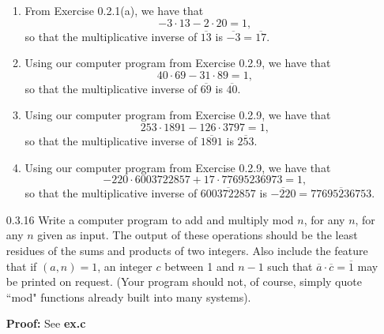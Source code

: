 \begin{enumerate}
      \begin{enumerate}
         \item From Exercise 0.2.1(a), we have that
               $$-3 \cdot 13 - 2 \cdot 20 = 1,$$
               so that the multiplicative inverse of $\overline{13}$ is
               $\overline{-3} = \overline{17}$.
         \item Using our computer program from Exercise 0.2.9, we have that
               $$40 \cdot 69 - 31 \cdot 89 = 1,$$
               so that the multiplicative inverse of $\overline{69}$ is
               $\overline{40}$.
         \item Using our computer program from Exercise 0.2.9, we have that
               $$253 \cdot 1891 - 126 \cdot 3797 = 1,$$
               so that the multiplicative inverse of $\overline{1891}$ is
               $\overline{253}$.
         \item Using our computer program from Exercise 0.2.9, we have that
               $$-220 \cdot 6003722857 + 17 \cdot 77695236973 = 1,$$
               so that the multiplicative inverse of $\overline{6003722857}$ is
               $\overline{-220} = \overline{77695236753}$.
      \end{enumerate}
   \item[0.3.16]  Write a computer program to add and multiply mod $n$, for any
                  $n$, for any $n$ given as input. The output of these
                  operations should be the least residues of the sums and 
                  products of two integers. Also include the feature that if
                  $(a, n) = 1$, an integer $c$ between 1 and $n - 1$ such that
                  $\overline{a} \cdot \overline{c} = \overline{1}$ may be
                  printed on request. (Your program should not, of course,
                  simply quote ``mod" functions already built into many
                  systems).

      \textbf{Proof:} See \textbf{ex.c}
\end{enumerate}
